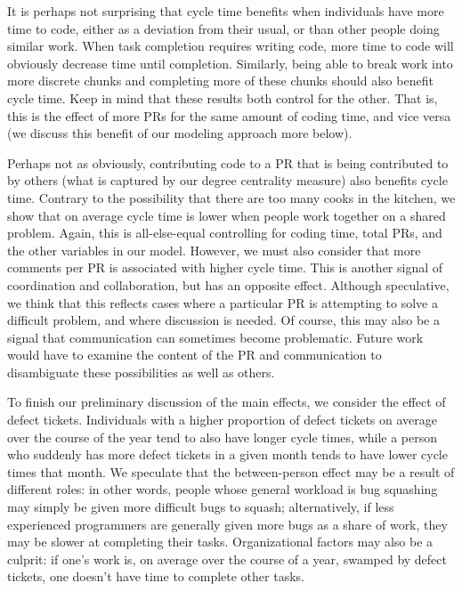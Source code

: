 \documentclass[
]{article}
\begin{document}
It is perhaps not surprising that cycle time benefits when individuals
have more time to code, either as a deviation from their usual, or than
other people doing similar work. When task completion requires writing
code, more time to code will obviously decrease time until completion.
Similarly, being able to break work into more discrete chunks and
completing more of these chunks should also benefit cycle time. Keep in
mind that these results both control for the other. That is, this is the
effect of more PRs for the same amount of coding time, and vice versa
(we discuss this benefit of our modeling approach more below).

Perhaps not as obviously, contributing code to a PR that is being
contributed to by others (what is captured by our degree centrality
measure) also benefits cycle time. Contrary to the possibility that
there are too many cooks in the kitchen, we show that on average cycle
time is lower when people work together on a shared problem. Again, this
is all-else-equal controlling for coding time, total PRs, and the other
variables in our model. However, we must also consider that more
comments per PR is associated with higher cycle time. This is another
signal of coordination and collaboration, but has an opposite effect.
Although speculative, we think that this reflects cases where a
particular PR is attempting to solve a difficult problem, and where
discussion is needed. Of course, this may also be a signal that
communication can sometimes become problematic. Future work would have
to examine the content of the PR and communication to disambiguate these
possibilities as well as others.

To finish our preliminary discussion of the main effects, we consider
the effect of defect tickets. Individuals with a higher proportion of
defect tickets on average over the course of the year tend to also have
longer cycle times, while a person who suddenly has more defect tickets
in a given month tends to have lower cycle times that month. We
speculate that the between-person effect may be a result of different
roles: in other words, people whose general workload is bug squashing
may simply be given more difficult bugs to squash; alternatively, if
less experienced programmers are generally given more bugs as a share of
work, they may be slower at completing their tasks. Organizational
factors may also be a culprit: if one's work is, on average over the
course of a year, swamped by defect tickets, one doesn't have time to
complete other tasks.
\end{document}
